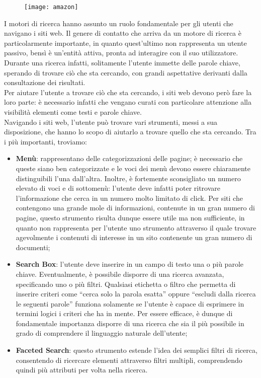 	\begin{figure}[htbp]
		\begin{center}
			\texttt{[image: amazon]}
		\end{center}
	\end{figure}
	
	I motori di ricerca hanno assunto un ruolo fondamentale per gli utenti che navigano i siti web. Il genere di contatto che arriva da un motore di ricerca è particolarmente importante, in quanto quest'ultimo non rappresenta un utente passivo, bensì è un'entità attiva, pronta ad interagire con il suo utilizzatore. Durante una ricerca infatti, solitamente l'utente immette delle parole chiave, sperando di trovare ciò che sta cercando, con grandi aspettative derivanti dalla consultazione dei risultati. \\
	Per aiutare l'utente a trovare ciò che sta cercando, i siti web devono però fare la loro parte: è necessario infatti che vengano curati con particolare attenzione alla visibilità elementi come testi e parole chiave.\\
	Navigando i siti web, l'utente può trovare vari strumenti, messi a sua disposizione, che hanno lo scopo di aiutarlo a trovare quello che sta cercando. Tra i più importanti, troviamo:
	\begin{itemize}
		\item {\textbf{Menù}: rappresentano delle categorizzazioni delle pagine; è necessario che queste siano ben categorizzate e le voci dei menù devono essere chiaramente distinguibili l'una dall'altra. Inoltre, è fortemente sconsigliato un numero elevato di voci e di sottomenù: l'utente deve infatti poter ritrovare l'informazione che cerca in un numero molto limitato di click. Per siti che contengono una grande mole di informazioni, contenute in un gran numero di pagine, questo strumento risulta dunque essere utile ma non sufficiente, in quanto non rappresenta per l'utente uno strumento attraverso il quale trovare agevolmente i contenuti di interesse in un sito contenente un gran numero di documenti;}
		\item{\textbf{Search Box}: l’utente deve inserire in un campo di testo una o più parole chiave. Eventualmente, è possibile disporre di una ricerca avanzata, specificando uno o più filtri. Qualsiasi etichetta o filtro che permetta di inserire criteri come “cerca solo la parola esatta” oppure “escludi dalla ricerca le seguenti parole” funziona solamente se l’utente è capace di esprimere in termini logici i criteri che ha in mente. Per essere efficace, è dunque di fondamentale importanza disporre di una ricerca che sia il più possibile in grado di comprendere il linguaggio naturale dell'utente;}
		\item{\textbf{Faceted Search}: questo strumento estende l'idea dei semplici filtri di ricerca, consentendo di ricercare elementi attraverso filtri multipli, comprendendo quindi più attributi per volta nella ricerca.}
	\end{itemize}
	
